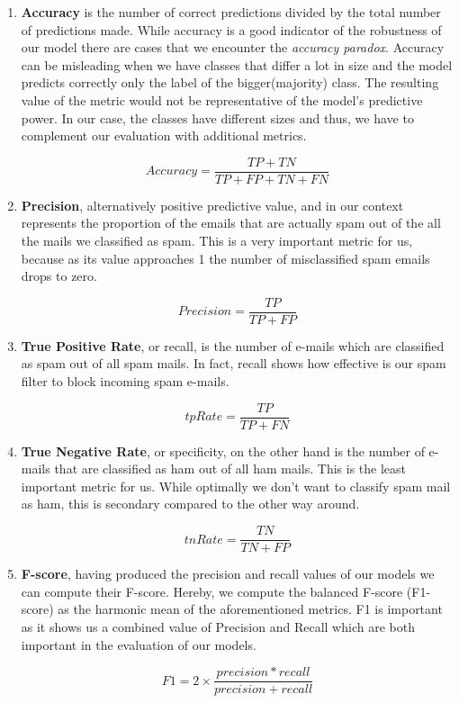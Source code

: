 \documentclass[12pt]{article}
\begin{document}
\begin{enumerate}
  \item \textbf{Accuracy} is the number of correct predictions divided by the total number of predictions made. While accuracy is a good indicator of the robustness of our model there are cases that we encounter the \textit{accuracy paradox}. Accuracy can be misleading when we have classes that differ a lot in size and the model predicts correctly only the label of the bigger(majority) class. The resulting value of the metric would not be representative of the model's predictive power. In our case, the classes have different sizes and thus, we have to complement our evaluation with additional metrics.

    \[ Accuracy = \frac{TP + TN}{TP + FP + TN + FN} \]

  \item \textbf{Precision}, alternatively positive predictive value, and in our context represents the proportion of the emails that are actually spam out of the all the mails we classified as spam. This is a very important metric for us, because as its value approaches 1 the number of misclassified spam emails drops to zero.

    \[ Precision = \frac{TP}{TP + FP} \]

  \item \textbf{True Positive Rate}, or recall, is the number of e-mails which are classified as spam out of all spam mails. In fact, recall shows how effective is our spam filter to block incoming spam e-mails.

    \[ tpRate = \frac{TP}{TP + FN} \]

  \item \textbf{True Negative Rate}, or specificity, on the other hand is the number of e-mails that are classified as ham out of all ham mails. This is the least important metric for us. While optimally we don't want to classify spam mail as ham, this is secondary compared to the other way around.

    \[ tnRate = \frac{TN}{TN + FP} \]

  \item \textbf{F-score}, having produced the precision and recall values of our models we can compute their F-score. Hereby, we compute the balanced F-score (F1-score) as the harmonic mean of the aforementioned metrics. F1 is important as it shows us a combined value of Precision and Recall which are both important in the evaluation of our models.

    \[F1 = 2 \times \frac{precision * recall}{precision + recall}\]


\end{enumerate}
\end{document}
